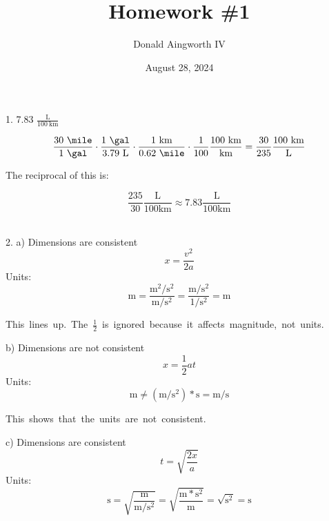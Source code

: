 \documentclass[12pt]{article}
\title{Homework \#1}
\author{Donald Aingworth IV}
\date{August 28, 2024}
\begin{document}

\maketitle

1. 7.83 $\frac{\unit{\liter}}{100\ \unit{\kilo\meter}}$

\begin{equation*}
    \frac{30\ \unit{\mile}}{1\ \unit{\gal}} \cdot \frac{1\ \unit{\gal}}{3.79\ \unit{\liter}} \cdot \frac{1\ \unit{\kilo\meter}}{0.62\ \unit{\mile}} \cdot \frac{1}{100} \frac{100\ \unit{\kilo\meter}}{\unit{\kilo\meter}} = \frac{30}{235} \frac{100\ \unit{\kilo\meter}}{\unit{\liter}}
\end{equation*}

The reciprocal of this is:

\begin{equation*}
    \frac{235}{30} \frac{\unit{\liter}}{100 \unit{\kilo\meter}} \approx \boxed{ 7.83 \frac{\unit{\liter}}{100 \unit{\kilo\meter}} }
\end{equation*}
\\
\pagebreak

2. a) Dimensions are consistent
\begin{equation*}
    x = \frac{v^2}{2a}
\end{equation*}
Units:
\begin{equation*}
    \unit{\meter} = \frac{\unit{\meter}^2 / \unit{\second}^2}{\unit{\meter} / \unit{\second}^2} = \frac{\unit{\meter}/\unit{\second}^2}{1/\unit{\second}^2} = \unit{\meter}
\end{equation*}

\hbox{This lines up. The $\frac{1}{2}$ is ignored because it affects magnitude, not units.}

b) Dimensions are not consistent
\begin{equation*}
    x = \frac{1}{2} at
\end{equation*}
Units:
\begin{equation*}
    \unit{\meter} \ne (\unit{\meter}/\unit{\second}^2)*\unit{\second} = \unit{\meter}/\unit{\second}
\end{equation*}

\hbox{This shows that the units are not consistent.}

c) Dimensions are consistent
\begin{equation*}
    t = \sqrt{\frac{2x}{a}}
\end{equation*}
Units:
\begin{equation*}
    \unit{\second} = \sqrt{\frac{\unit{\meter}}{\unit{\meter}/\unit{\second}^2}} = \sqrt{\frac{\unit{\meter}*\unit{\second}^2}{\unit{\meter}}} = \sqrt{\unit{\second}^2} = \unit{\second}
\end{equation*}
\end{document}
